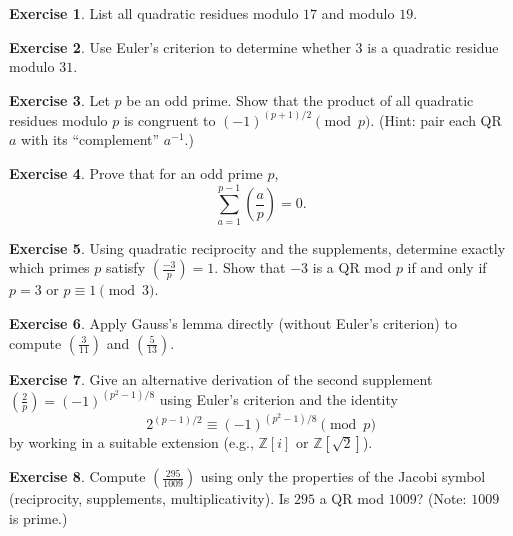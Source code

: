 \documentclass[12pt,a4paper,openany]{book}
\theoremstyle{definition}
\newtheorem{exercise}{Exercise}[chapter]
\theoremstyle{plain}
\theoremstyle{remark}
\newcommand{\Z}{\mathbb{Z}}
\newcommand{\legendre}[2]{\left(\frac{#1}{#2}\right)}
\newcommand{\jacobi}[2]{\left(\frac{#1}{#2}\right)}
\begin{document}
\begin{exercise}
\label{exer:qr-list}
List all quadratic residues modulo $17$ and modulo $19$.
\end{exercise}

\begin{exercise}
\label{exer:euler-criterion-compute}
Use Euler's criterion to determine whether $3$ is a quadratic residue modulo $31$.
\end{exercise}

\begin{exercise}
\label{exer:qr-product}
Let $p$ be an odd prime. Show that the product of all quadratic residues
modulo $p$ is congruent to $(-1)^{(p+1)/2} \pmod{p}$.
\textup{(}Hint: pair each QR $a$ with its ``complement'' $a^{-1}$.\textup{)}
\end{exercise}

\begin{exercise}
\label{exer:minus-one-sum}
Prove that for an odd prime $p$,
\[
  \sum_{a=1}^{p-1} \legendre{a}{p} = 0.
\]
\end{exercise}

\begin{exercise}
\label{exer:qr-minus3}
Using quadratic reciprocity and the supplements, determine exactly which primes $p$
satisfy $\legendre{-3}{p} = 1$. Show that $-3$ is a QR mod $p$ if and only if
$p = 3$ or $p \equiv 1 \pmod{3}$.
\end{exercise}

\begin{exercise}
\label{exer:gauss-lemma-apply}
Apply Gauss's lemma directly (without Euler's criterion) to compute
$\legendre{3}{11}$ and $\legendre{5}{13}$.
\end{exercise}

\begin{exercise}
\label{exer:second-supplement-derive}
Give an alternative derivation of the second supplement $\legendre{2}{p} = (-1)^{(p^2-1)/8}$
using Euler's criterion and the identity
\[
  2^{(p-1)/2} \equiv (-1)^{(p^2-1)/8} \pmod{p}
\]
by working in a suitable extension (e.g., $\Z[i]$ or $\Z[\sqrt{2}]$).
\end{exercise}

\begin{exercise}
\label{exer:jacobi-compute}
Compute $\jacobi{295}{1009}$ using only the properties of the Jacobi symbol
(reciprocity, supplements, multiplicativity). Is $295$ a QR mod $1009$?
\textup{(}Note: $1009$ is prime.\textup{)}
\end{exercise}
\end{document}
